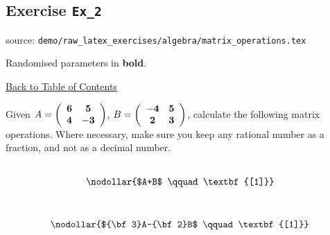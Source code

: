 \documentclass[a4paper, leqno, 12pt]{report}
\newenvironment{top_enumerate}{
\begin{enumerate}
  \setlength{\itemsep}{2em}
  \setlength{\topsep}{-0pt}
  \setlength{\partopsep}{-0pt}
}{\end{enumerate}}
\newlength{\EqL}
\newlength{\RunL}
\newcommand{\EqContent}{foo}
\begin{document}
\subsection{Exercise \texttt{Ex\_2}}
source: \texttt{demo/raw\_latex\_exercises/algebra/matrix\_operations.tex}

Randomised parameters in \textbf{bold}. 

\hyperlink{contents}{Back to Table of Contents}
\begin{top_enumerate}
\item Given \(A=\left( {\begin{array}{cc}
   {\bf 6} & {\bf 5} \\
   {\bf 4} & {\bf -3} \\
 \end{array} } \right) \), \(B=\left( {\begin{array}{cc}
     {\bf -4} & {\bf 5} \\
     {\bf 2} & {\bf 3} \\
    \end{array} } \right) \), calculate the following matrix operations. Where necessary, make sure you keep any rational number as a fraction, and not as a decimal number.
 \\ 
\setcounter{equation}{0}  %
\setlength{\RunL}{0pt}
	\renewcommand{\EqContent}{\nodollar{$A+B$
	\qquad\textbf{[1]}}}
	\settowidth{\EqL}{$\qquad\EqContent\qquad$}
	\setlength{\RunL}{\RunL+\EqL}
		{\setlength{\RunL}{0pt}
		\\}
		{}
	\begin{minipage}{\EqL}
	\begin{equation}
	\EqContent
	\end{equation}
	\end{minipage}
	\renewcommand{\EqContent}{\nodollar{${\bf 3}A-{\bf 2}B$
	\qquad\textbf{[1]}}}
	\settowidth{\EqL}{$\qquad\EqContent\qquad$}
	\setlength{\RunL}{\RunL+\EqL}
		{\setlength{\RunL}{0pt}
		\\}
		{}
	\begin{minipage}{\EqL}
	\begin{equation}
	\EqContent
	\end{equation}
	\end{minipage}
	\renewcommand{\EqContent}{\nodollar{${\bf 6}A+{\bf 3}B$
	\qquad\textbf{[1]}}}
	\settowidth{\EqL}{$\qquad\EqContent\qquad$}
	\setlength{\RunL}{\RunL+\EqL}
		{\setlength{\RunL}{0pt}
}
\end{top_enumerate}
\end{document}
